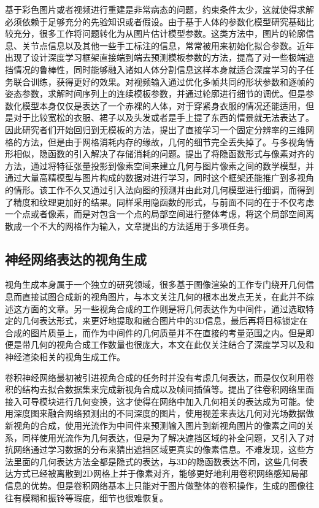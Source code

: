 基于彩色图片或者视频进行重建是非常病态的问题，约束条件太少，这就使得求解必须依赖于足够充分的先验知识或者假设。由于基于人体的参数化模型研究基础比较充分\citep{loper2015smpl, anguelov2005scape}，很多工作将问题转化为从图片估计模型参数。这类方法中，图片的轮廓信息、关节点信息\citep{cao2019openpose, fang2017rmpe}以及其他一些手工标注的信息，常常被用来初始化拟合参数\citep{zhou2010, guan2009}。近年出现了设计深度学习框架直接端到端去预测模板参数的方法\citep{Pavlakos_2018_CVPR, kanazawa2018}，提高了对一些极端遮挡情况的鲁棒性，同时能够融入诸如人体分割信息这样本身就适合深度学习的子任务联合训练\citep{omran2018nbf}，获得更好的效果。\citet{alldieck2018video}对视频输入通过优化多帧共同的形状参数和逐帧的姿态参数，求解时间序列上的连续模板参数，并通过轮廓进行细节的调优。但是参数化模型本身仅仅是表达了一个赤裸的人体，对于穿紧身衣服的情况还能适用，但是对于比较宽松的衣服、裙子以及头发或者是手上提了东西的情景就无法表达了。因此研究者们开始回归到无模板的方法，\citet{varol2018}提出了直接学习一个固定分辨率的三维网格的方法，但是由于网格消耗内存的缘故，几何的细节完全丢失掉了。与多视角情形相似，隐函数的引入解决了存储消耗的问题。\citet{saito2019pifu}提出了将隐函数形式与像素对齐的方法，通过将特征张量投影到像素空间来建立几何与图片像素之间的数学模型，并通过大量高精模型与图片构成的数据对进行学习，同时这个框架还能推广到多视角的情形。该工作不久又通过引入法向图的预测并由此对几何模型进行细调，而得到了精度和纹理更加好的结果\citep{saito2020pifuhd}。\citet{Chibane_2020_CVPR}同样采用隐函数的形式，与前面不同的在于不仅考虑一个点或者像素，而是对包含一个点的局部空间进行整体考虑，将这个局部空间离散成一个不大的网格作为输入，文章提出的方法适用于多项任务。

\subsection{神经网络表达的视角生成}
视角生成本身属于一个独立的研究领域，很多基于图像渲染的工作专门绕开几何信息而直接试图合成新的视角图片，与本文关注几何的根本出发点无关，在此并不综述这方面的文章。另一些视角合成的工作则是将几何表达作为中间件，通过选取特定的几何表达形式，来更好地提取和融合图片中的3D信息，最后再将目标锁定在合成的图片质量上，而作为中间件的几何质量并不在直接的考量范围之内。但是即便是带几何的视角合成工作数量也很庞大，本文在此仅关注结合了深度学习以及和神经渲染相关的视角生成工作。

卷积神经网络最初被引进视角合成的任务时并没有考虑几何表达，而是仅仅利用卷积的结构去拟合数据集来完成新视角合成\citep{TDB16a}以及帧间插值等\citep{niklaus2017}。\citet{jaderberg2015}提出了往卷积网络里面接入可导模块进行几何变换，这才使得在网络中加入几何相关的表达成为可能。\citet{flynn2016}使用深度图来融合网络预测出的不同深度的图片，\citet{kalantari2016}使用视差来表达几何对光场数据做新视角的合成，\citet{zhou2016view}使用光流作为中间件来预测输入图片到新视角图片的像素之间的关系，\citet{tvsn_cvpr2017}同样使用光流作为几何表达，但是为了解决遮挡区域的补全问题，又引入了对抗网络通过学习数据的分布来猜出遮挡区域更真实的像素信息。不难发现，这些方法里面的几何表达方法全都是隐式的表达，与3D的隐函数表达不同，这些几何表达方式已经被离散到2D网格上并于像素对齐，能够更好地利用卷积网络感知局部信息的优势。但是卷积网络基本上只能对于图片做整体的卷积操作，生成的图像往往有模糊和振铃等瑕疵，细节也很难恢复。


